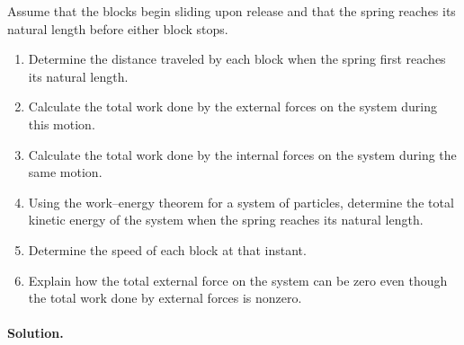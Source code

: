 \documentclass[12pt]{article}
\begin{document}
Assume that the blocks begin sliding upon release and that the spring reaches its natural length before either block stops.

\begin{enumerate}
    \item Determine the distance traveled by each block when the spring first reaches its natural length.
    \item Calculate the total work done by the external forces on the system during this motion.
    \item Calculate the total work done by the internal forces on the system during the same motion.
    \item Using the work--energy theorem for a system of particles, determine the total kinetic energy of the system when the spring reaches its natural length.
    \item Determine the speed of each block at that instant.
    \item Explain how the total external force on the system can be zero even though the total work done by external forces is nonzero.
\end{enumerate}

\paragraph{Solution.}
\end{document}

